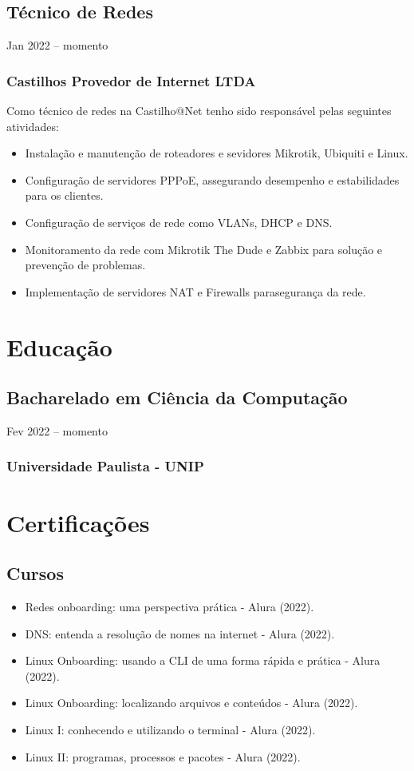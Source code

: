 \documentclass{cv}
\begin{document}
\subsection{Técnico de Redes}
{Jan 2022 -- momento}
\subsubsection{Castilhos Provedor de Internet LTDA}

Como técnico de redes na Castilho@Net tenho sido responsável pelas
seguintes atividades:

\begin{itemize}
  \item Instalação e manutenção de roteadores e sevidores Mikrotik,
    Ubiquiti e Linux.
  \item Configuração de servidores PPPoE, assegurando desempenho e
    estabilidades para os clientes.
  \item Configuração de serviços de rede como VLANs, DHCP e DNS.
  \item Monitoramento da rede com Mikrotik The Dude e Zabbix para
    solução e prevenção de problemas.
  \item Implementação de servidores NAT e Firewalls parasegurança da rede.
\end{itemize}

\section{Educação}

\subsection{Bacharelado em Ciência da Computação}
{Fev 2022 -- momento}
\subsubsection{Universidade Paulista - UNIP}

\section{Certificações}

\subsection{Cursos}

\begin{itemize}
  \item Redes onboarding: uma perspectiva prática - Alura (2022).
  \item DNS: entenda a resolução de nomes na internet - Alura (2022).
  \item Linux Onboarding: usando a CLI de uma forma rápida e prática - Alura (2022).
  \item Linux Onboarding: localizando arquivos e conteúdos - Alura (2022).
  \item Linux I: conhecendo e utilizando o terminal - Alura (2022).
  \item  Linux II: programas, processos e pacotes - Alura (2022).
\end{itemize}
\end{document}
